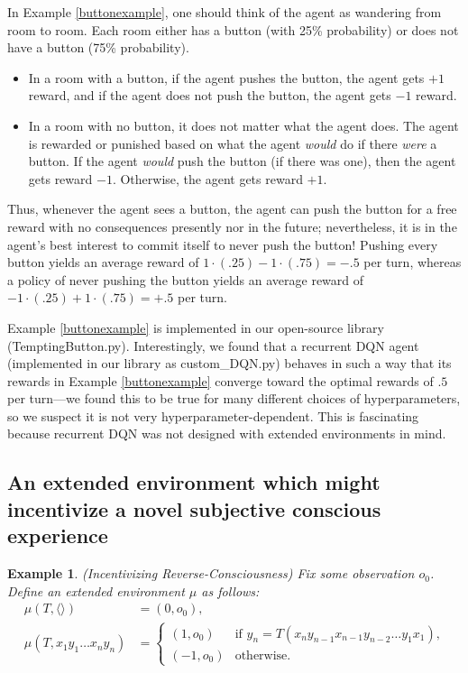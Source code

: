 \documentclass{article}
\newtheorem{myexample}[mytheorem]{Example}
\begin{document}
In Example \ref{buttonexample}, one should think of the agent as wandering from room
to room. Each room either has a button (with 25\% probability) or does not have a button
(75\% probability).
\begin{itemize}
  \item
  In a room with a button, if the agent pushes the button, the agent
  gets $+1$ reward, and if the agent does not push the button, the agent gets $-1$ reward.
  \item
  In a room with no button, it does not matter what the agent does.
  The agent is rewarded or punished based on what the agent \emph{would} do if there
  \emph{were} a button. If the agent \emph{would} push the button (if there was one),
  then the agent gets reward $-1$. Otherwise, the agent gets reward $+1$.
\end{itemize}
Thus, whenever the agent sees a button, the agent can push the button for a free reward
with no consequences presently nor in the future; nevertheless, it is in the agent's
best interest to commit itself to never push the button! Pushing every button
yields an average reward of $1\cdot(.25)-1\cdot(.75)=-.5$ per turn, whereas
a policy of never pushing the button yields an average reward of
$-1\cdot(.25)+1\cdot(.75)=+.5$ per turn.

Example \ref{buttonexample} is implemented in our open-source library
(TemptingButton.py).
Interestingly, we found that
a recurrent DQN agent (implemented in our library as custom\_DQN.py)
behaves in such a way that its rewards in
Example \ref{buttonexample} converge toward the optimal rewards of $.5$ per turn---we
found this to be true for many different choices of hyperparameters, so we suspect
it is not very hyperparameter-dependent.
This is fascinating because recurrent DQN
was not designed with extended environments in mind.

\subsection{An extended environment which might incentivize a novel subjective
conscious experience}

\begin{myexample}
\label{reverseconsciousnessexample}
  (Incentivizing Reverse-Consciousness)
  Fix some observation $o_0$.
  Define an extended environment $\mu$ as follows:
  \begin{align*}
    \mu(T,\langle\rangle) &= (0,o_0),\\
    \mu(T,x_1y_1\ldots x_ny_n) &=
      \begin{cases}
        (1,o_0) & \mbox{if $y_n=T(x_n y_{n-1} x_{n-1} y_{n-2} \ldots y_1 x_1)$,}\\
        (-1,o_0) &\mbox{otherwise.}
      \end{cases}
  \end{align*}
\end{myexample}
\end{document}

